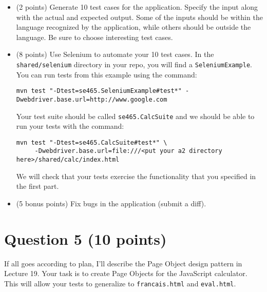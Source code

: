 \documentclass[10pt,hidelinks]{article}
\begin{document}
\begin{itemize}
\item (2 points) Generate 10 test cases for the application. Specify the input along with the actual and expected output. Some of the inputs should be within the language recognized by the application, while others should be outside the language. Be sure to choose interesting test cases.

\item (8 points) Use Selenium to automate your 10 test cases. In the {\tt shared/selenium} directory in your repo, you will find a {\tt SeleniumExample}. You can run tests from this example using the command:

\begin{verbatim}
mvn test "-Dtest=se465.SeleniumExample#test*" -Dwebdriver.base.url=http://www.google.com
\end{verbatim}

Your test suite should be called {\tt se465.CalcSuite} and we should be able to run your tests with the command:

\begin{verbatim}
mvn test "-Dtest=se465.CalcSuite#test*" \
     -Dwebdriver.base.url=file:///<put your a2 directory here>/shared/calc/index.html
\end{verbatim}

We will check that your tests exercise the functionality that you specified in the first part.

\item (5 bonus points) Fix bugs in the application (submit a diff).
\end{itemize}


\section*{Question 5 (10 points)}

If all goes according to plan, I'll describe the Page Object design pattern in Lecture 19. Your task is to create Page Objects for the JavaScript calculator. This will allow your tests to generalize to {\tt francais.html} and
{\tt eval.html}.
\end{document}
